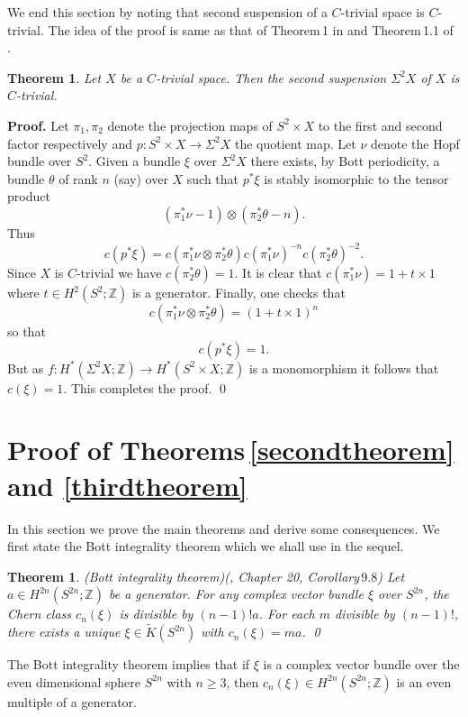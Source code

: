 \documentclass[12pt,reqno]{amsart}
\numberwithin{equation}{subsection}
\newtheorem{Thm}[subsection]{Theorem}
\theoremstyle{definition}
\begin{document}
We end this section by noting that second suspension of a $C$-trivial space is $C$-trivial. The idea of the proof is  same 
as that of Theorem\,1 in \cite{atiyahirz} and Theorem\,1.1 of \cite{tanaka}. 

\begin{Thm}\label{hahaha}
Let $X$ be a $C$-trivial space. Then the second suspension $\Sigma^2X$ of $X$ is $C$-trivial. 
\end{Thm}
{\bf Proof.} Let $\pi_1,\pi_2$ denote the projection maps of $S^2\times X$ to the first and second factor respectively and $p:S^2\times X\longrightarrow \Sigma^2X$ the quotient map. Let $\nu$ denote the Hopf bundle over $S^2$. Given a bundle $\xi$ over $\Sigma^2X$ there exists, by Bott periodicity, a bundle $\theta$ of rank $n$ (say) over $X$ such that $p^*\xi$ is stably isomorphic to the tensor product 
$$(\pi_1^*\nu-1)\otimes (\pi_2^*\theta-n).$$
Thus 
$$c(p^*\xi)=c(\pi_1^*\nu\otimes\pi_2^*\theta)c(\pi_1^*\nu)^{-n}c(\pi_2^*\theta)^{-2}.$$
Since $X$ is $C$-trivial we have $c(\pi_2^*\theta)=1$. It is clear that $c(\pi_1^*\nu)=1+t\times 1$ where $t\in H^2(S^2;\mathbb Z)$ is a generator. 
Finally, one checks that 
$$c(\pi_1^*\nu\otimes\pi_2^*\theta)=(1+t\times 1)^n$$
so that 
$$c(p^*\xi)=1.$$
But as $f:H^*(\Sigma^2X;\mathbb Z)\longrightarrow H^*(S^2\times X;\mathbb Z)$ is a monomorphism it follows that $c(\xi)=1$. This completes the proof. \qed

\section{Proof of Theorems\,\ref{secondtheorem} and \ref{thirdtheorem}}

In this section we prove the main theorems and derive some consequences. We first state the Bott integrality theorem which we shall use in the sequel. 

\begin{Thm} {\rm(Bott integrality theorem)}\label{bott} {\rm(\cite{hus}, Chapter 20, Corollary\,$9.8$)} Let $a\in H^{2n}(S^{2n};\mathbb Z)$ be a generator. For any complex vector bundle $\xi$ over $S^{2n}$, the Chern class $c_n(\xi)$ is divisible by $(n-1)!a$. For each $m$ divisible by $(n-1)!$, there exists a unique $\xi\in\widetilde{K}(S^{2n})$ with $c_n(\xi)=ma$. \qed
\end{Thm}

The Bott integrality theorem implies that if $\xi$ is a complex vector bundle over the even dimensional sphere $S^{2n}$ with $n \geq 3$, then $c_n(\xi) \in H^{2n}(S^{2n};\mathbb Z)$ is an even multiple of a generator.
\end{document}
